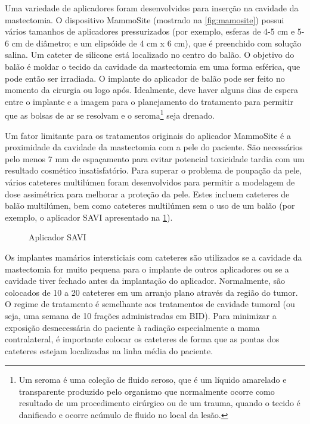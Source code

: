\documentclass[11pt,a4paper]{article}
\newcounter{exemplo}
\begin{document}
	Uma variedade de aplicadores foram desenvolvidos para inserção na cavidade da mastectomia. O dispositivo MammoSite (mostrado na \ref{fig:mamosite}) possui vários tamanhos de aplicadores  pressurizados (por exemplo, esferas de 4-5 cm e 5-6 cm de diâmetro; e um elipsóide de 4 cm x 6 cm), que é preenchido com solução salina. Um cateter de silicone está localizado no centro do balão. O objetivo do balão é moldar o tecido da cavidade da mastectomia em uma forma esférica, que pode então ser irradiada. O implante do aplicador de balão pode ser feito no momento da cirurgia ou logo após. Idealmente, deve haver alguns dias de espera entre o implante e a imagem para o planejamento do tratamento para permitir que as bolsas de ar se resolvam e o seroma\footnote{Um seroma é uma coleção de fluido seroso, que é um líquido amarelado e transparente produzido pelo organismo que normalmente ocorre como resultado de um procedimento cirúrgico ou de um trauma, quando o tecido é danificado e ocorre acúmulo de fluido no local da lesão. } seja drenado.

	Um fator limitante para os tratamentos originais do aplicador MammoSite é a proximidade da cavidade da mastectomia com a pele do paciente. São necessários pelo menos 7 mm de espaçamento para evitar potencial toxicidade tardia com um resultado cosmético insatisfatório. Para superar o problema de poupação da pele, vários cateteres multilúmen foram desenvolvidos para permitir a modelagem de dose assimétrica para melhorar a proteção da pele. Estes incluem cateteres de balão multilúmen, bem como cateteres multilúmen sem o uso de um balão (por exemplo, o aplicador SAVI apresentado na \ref{fig:savi}).

	\begin{figure}
		\centering
		\caption{Aplicador SAVI}
		\label{fig:savi}
	\end{figure}

	Os implantes mamários intersticiais com cateteres são utilizados se a cavidade da mastectomia for muito pequena para o implante de outros aplicadores ou se a cavidade tiver fechado antes da implantação do aplicador. Normalmente, são colocados de 10 a 20 cateteres em um arranjo plano através da região do tumor. O regime de tratamento é semelhante aos tratamentos de cavidade tumoral (ou seja, uma semana de 10 frações administradas em BID). Para minimizar a exposição desnecessária do paciente à radiação especialmente a mama contralateral, é importante colocar os cateteres de forma que as pontas dos cateteres estejam localizadas na linha média do paciente.
\end{document}
